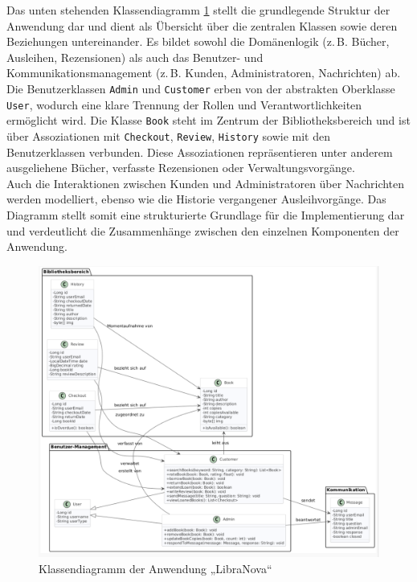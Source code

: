 Das unten stehenden Klassendiagramm \ref{fig:class_diagram} stellt die grundlegende Struktur der Anwendung dar und dient als Übersicht über die zentralen Klassen sowie deren Beziehungen untereinander. Es bildet sowohl die Domänenlogik (z.\,B. Bücher, Ausleihen, Rezensionen) als auch das Benutzer- und Kommunikationsmanagement (z.\,B. Kunden, Administratoren, Nachrichten) ab. \\ 
Die Benutzerklassen \texttt{Admin} und \texttt{Customer} erben von der abstrakten Oberklasse \texttt{User}, wodurch eine klare Trennung der Rollen und Verantwortlichkeiten ermöglicht wird. Die Klasse \texttt{Book} steht im Zentrum der Bibliotheksbereich und ist über Assoziationen mit \texttt{Checkout}, \texttt{Review}, \texttt{History} sowie mit den Benutzerklassen verbunden. Diese Assoziationen repräsentieren unter anderem ausgeliehene Bücher, verfasste Rezensionen oder Verwaltungsvorgänge.\\ 
Auch die Interaktionen zwischen Kunden und Administratoren über Nachrichten werden modelliert, ebenso wie die Historie vergangener Ausleihvorgänge. Das Diagramm stellt somit eine strukturierte Grundlage für die Implementierung dar und verdeutlicht die Zusammenhänge zwischen den einzelnen Komponenten der Anwendung.

\begin{figure}[H]
	\centering
	\includegraphics[width=\textwidth]{images/ClassDiagram.png}
	\caption{Klassendiagramm der Anwendung „LibraNova“}
	\label{fig:class_diagram}
\end{figure}

